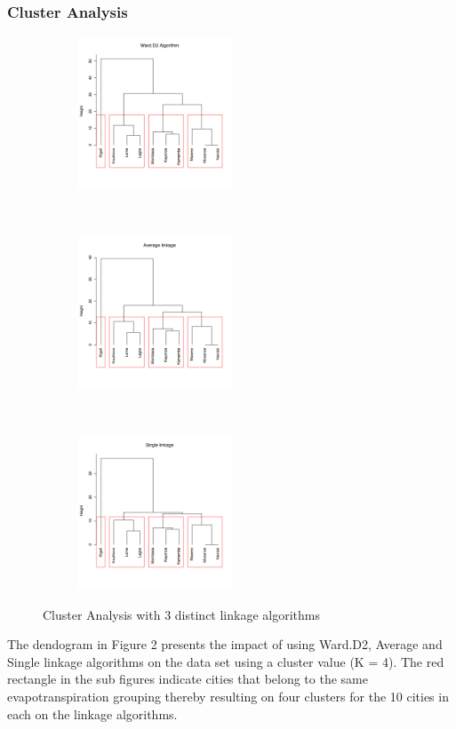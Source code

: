 \documentclass[12pt,a4paper]{article}
\begin{document}
\subsubsection{Cluster Analysis}
\begin{figure}[!h]
    \centering
    \begin{subfigure}[t]{0.3\textwidth}
        \centering
        \includegraphics[height=1.8in]{./gaphics/q001_a.png}
        \caption{}
    \end{subfigure}%
    ~ 
    \begin{subfigure}[t]{0.3\textwidth}
        \centering
        \includegraphics[height=1.8in]{./gaphics/q001_b.png}
        \caption{}
    \end{subfigure}%
    ~ 
    \begin{subfigure}[t]{0.3\textwidth}
        \centering
        \includegraphics[height=1.8in]{./gaphics/q001_c.png}
        \caption{}
    \end{subfigure}
    \label{fig:cluster_algorithms}
    \caption{Cluster Analysis with 3 distinct linkage algorithms}
\end{figure}
The dendogram in Figure 2 presents the impact of using Ward.D2,  Average and Single linkage algorithms on the data set using a cluster value (K = 4). The red rectangle in the sub figures indicate cities that belong to the same evapotranspiration grouping thereby resulting on four clusters for the 10 cities in each on the linkage algorithms.
\end{document}
